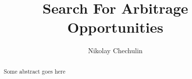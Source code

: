 \documentclass[14pt, a4paper]{extreport}
\begin{document}
\title{Search For Arbitrage Opportunities}
\author{Nikolay Chechulin}


\thispagestyle{empty}  %
\maketitle
\begin{abstract}
    Some abstract goes here
\end{abstract}

\tableofcontents
\pagebreak
\end{document}
